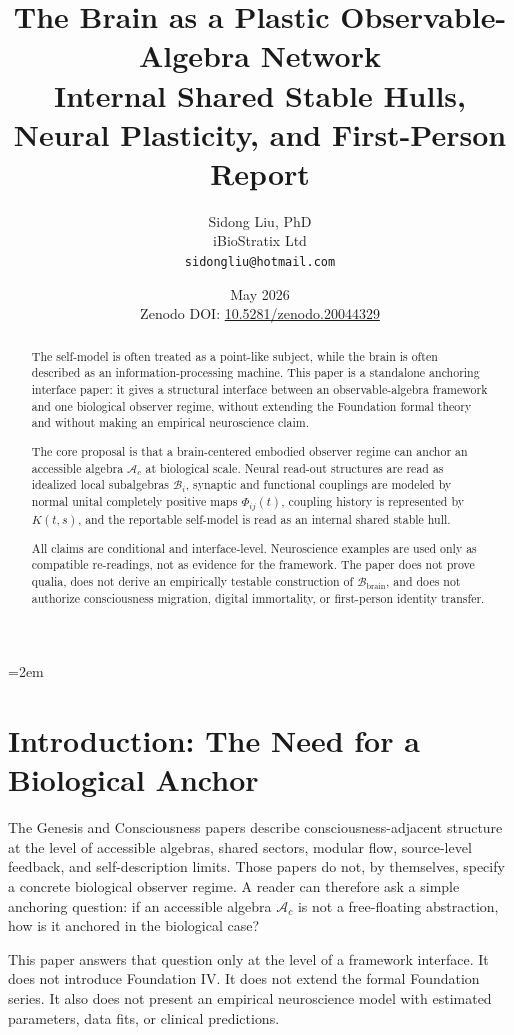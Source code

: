 \documentclass[12pt]{article}
\title{%
  \textbf{The Brain as a Plastic Observable-Algebra Network}\\
  \textbf{Internal Shared Stable Hulls, Neural Plasticity, and First-Person Report}%
}
\author{
  Sidong Liu, PhD \\
  \small iBioStratix Ltd \\
  \small \texttt{sidongliu@hotmail.com}
}
\date{May 2026\\
\small Zenodo DOI: \href{https://doi.org/10.5281/zenodo.20044329}{10.5281/zenodo.20044329}}
\theoremstyle{definition}
\theoremstyle{remark}
\newcommand{\Ac}{\mathcal A_c}
\newcommand{\Bbrain}{\mathcal B_{\mathrm{brain}}}
\begin{document}
\emergencystretch=2em
\raggedbottom
{}

\maketitle

\begin{abstract}
The self-model is often treated as a point-like subject, while the brain
is often described as an information-processing machine. This paper is a
standalone anchoring interface paper: it gives a structural interface
between an observable-algebra framework and one biological observer
regime, without extending the Foundation formal theory and without
making an empirical neuroscience claim.

The core proposal is that a brain-centered embodied observer regime can
anchor an accessible algebra \(\Ac\) at biological scale. Neural
read-out structures are read as idealized local subalgebras
\(\mathcal B_i\), synaptic and functional couplings are modeled by
normal unital completely positive maps \(\Phi_{ij}(t)\), coupling
history is represented by \(K(t,s)\), and the reportable self-model is
read as an internal shared stable hull.

All claims are conditional and interface-level. Neuroscience examples
are used only as compatible re-readings, not as evidence for the
framework. The paper does not prove qualia, does not derive an
empirically testable construction of \(\Bbrain\), and does not authorize
consciousness migration, digital immortality, or first-person identity
transfer.
\end{abstract}

\clearpage
\tableofcontents
\clearpage

\section{Introduction: The Need for a Biological Anchor}

The Genesis and Consciousness papers describe consciousness-adjacent
structure at the level of accessible algebras, shared sectors, modular
flow, source-level feedback, and self-description limits. Those papers
do not, by themselves, specify a concrete biological observer regime. A
reader can therefore ask a simple anchoring question: if an accessible
algebra \(\Ac\) is not a free-floating abstraction, how is it anchored in
the biological case?

This paper answers that question only at the level of a framework
interface. It does not introduce Foundation IV. It does not extend the
formal Foundation series. It also does not present an empirical
neuroscience model with estimated parameters, data fits, or clinical
predictions.
\end{document}
